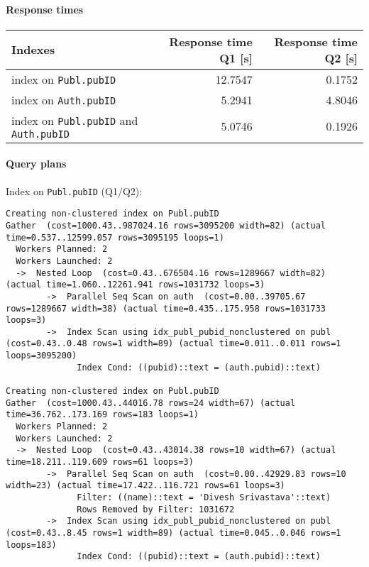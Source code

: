 \documentclass[11pt]{scrartcl}
\begin{document}
\paragraph{Response times}\mbox{}

\begin{table}[H]
  \centering
  \begin{tabular}{l|r|r}
    Indexes & Response time Q1 [s] & Response time Q2 [s] \tabularnewline
    \hline
    index on \texttt{Publ.pubID} & 12.7547 & 0.1752 \tabularnewline
    index on \texttt{Auth.pubID} & 5.2941 & 4.8046 \tabularnewline
    index on \texttt{Publ.pubID} and \texttt{Auth.pubID} & 5.0746 & 0.1926
        \tabularnewline
  \end{tabular}
\end{table}

\paragraph{Query plans}\mbox{}

Index on \texttt{Publ.pubID} (Q1/Q2):

{\small
\parskip0pt\begin{verbatim}
Creating non-clustered index on Publ.pubID
Gather  (cost=1000.43..987024.16 rows=3095200 width=82) (actual time=0.537..12599.057 rows=3095195 loops=1)
  Workers Planned: 2
  Workers Launched: 2
  ->  Nested Loop  (cost=0.43..676504.16 rows=1289667 width=82) (actual time=1.060..12261.941 rows=1031732 loops=3)
        ->  Parallel Seq Scan on auth  (cost=0.00..39705.67 rows=1289667 width=38) (actual time=0.435..175.958 rows=1031733 loops=3)
        ->  Index Scan using idx_publ_pubid_nonclustered on publ  (cost=0.43..0.48 rows=1 width=89) (actual time=0.011..0.011 rows=1 loops=3095200)  
              Index Cond: ((pubid)::text = (auth.pubid)::text)

Creating non-clustered index on Publ.pubID
Gather  (cost=1000.43..44016.78 rows=24 width=67) (actual time=36.762..173.169 rows=183 loops=1)
  Workers Planned: 2
  Workers Launched: 2
  ->  Nested Loop  (cost=0.43..43014.38 rows=10 width=67) (actual time=18.211..119.609 rows=61 loops=3)
        ->  Parallel Seq Scan on auth  (cost=0.00..42929.83 rows=10 width=23) (actual time=17.422..116.721 rows=61 loops=3)
              Filter: ((name)::text = 'Divesh Srivastava'::text)
              Rows Removed by Filter: 1031672
        ->  Index Scan using idx_publ_pubid_nonclustered on publ  (cost=0.43..8.45 rows=1 width=89) (actual time=0.045..0.046 rows=1 loops=183)      
              Index Cond: ((pubid)::text = (auth.pubid)::text)
\end{verbatim}}
\end{document}
